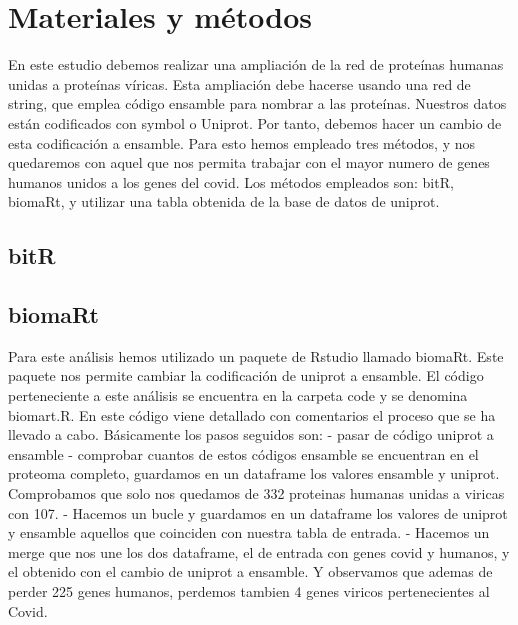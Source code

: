 \section{Materiales y métodos}

En este estudio debemos realizar una ampliación de la red de proteínas humanas unidas a proteínas víricas.
Esta ampliación debe hacerse usando una red de string, que emplea código ensamble para nombrar a las proteínas.
Nuestros datos están codificados con symbol o Uniprot. Por tanto, debemos hacer un cambio de esta codificación a ensamble.
Para esto hemos empleado tres métodos, y nos quedaremos con aquel que nos permita trabajar con el mayor numero de genes humanos unidos a los genes del covid.
Los métodos empleados son: bitR, biomaRt, y utilizar una tabla obtenida de la base de datos de uniprot. 
\subsection{bitR}


\subsection{biomaRt}
Para este análisis hemos utilizado un paquete de Rstudio llamado biomaRt. Este paquete nos permite cambiar la codificación de uniprot a ensamble.
El código perteneciente a este análisis se encuentra en la carpeta code y se denomina biomart.R. En este código viene detallado con comentarios el
proceso que se ha llevado a cabo. Básicamente los pasos seguidos son: 
- pasar de código uniprot a ensamble
- comprobar cuantos de estos códigos ensamble se encuentran en el proteoma completo, guardamos en un dataframe los valores ensamble y uniprot.  Comprobamos que solo nos quedamos de 332 proteinas humanas unidas a viricas con 107.
- Hacemos un bucle y guardamos en un dataframe los valores de uniprot y ensamble aquellos que coinciden con nuestra tabla de entrada.
- Hacemos un merge que nos une los dos dataframe, el de entrada con genes covid y humanos, y el obtenido con el cambio de uniprot a ensamble. Y observamos que ademas de perder 225 genes humanos, perdemos tambien 4 genes viricos pertenecientes al Covid. 


